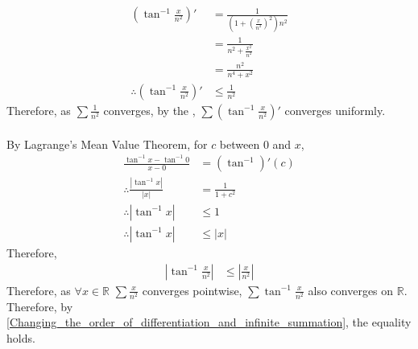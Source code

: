 \documentclass[fleqn, a4paper, 12pt, twoside]{article}
\theoremstyle{definition}
\theoremstyle{theorem}
\begin{document}
\begin{solution}
	\begin{align*}
		\left( \tan^{-1} \frac{x}{n^2} \right)'            & = \frac{1}{\left( 1 + \left( \frac{x}{n^2} \right)^2 \right) n^2} \\
                                                                   & = \frac{1}{n^2 + \frac{x^2}{n^2}}                                 \\
                                                                   & = \frac{n^2}{n^4 + x^2}                                           \\
		\therefore \left( \tan^{-1} \frac{x}{n^2} \right)' & \le \frac{1}{n^2}
	\end{align*}
	Therefore, as $\sum \frac{1}{n^2}$ converges, by the , $\sum \left( \tan^{-1} \frac{x}{n^2} \right)'$ converges uniformly.\\
	~\\
	By Lagrange's Mean Value Theorem, for $c$ between $0$ and $x$,
	\begin{align*}
		\frac{\tan^{-1} x - \tan^{-1} 0}{x - 0} & = (\tan^{-1})'(c)   \\
		\therefore \frac{|\tan^{-1} x|}{|x|}    & = \frac{1}{1 + c^2} \\
		\therefore |\tan^{-1} x|                & \le 1               \\
		\therefore |\tan^{-1} x|                & \le |x|
	\end{align*}
	Therefore,
	\begin{align*}
		\left| \tan^{-1} \frac{x}{n^2} \right| & \le \left| \frac{x}{n^2} \right|
	\end{align*}
	Therefore, as $\forall x \in \mathbb{R}$ $\sum \frac{x}{n^2}$ converges pointwise, $\sum \tan^{-1} \frac{x}{n^2}$ also converges on $\mathbb{R}$.\\
	Therefore, by \autoref{Changing_the_order_of_differentiation_and_infinite_summation}, the equality holds.
\end{solution}
\end{document}
